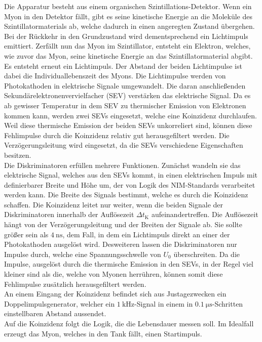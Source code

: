 Die Apparatur besteht aus einem organischen Szintillations-Detektor.
Wenn ein Myon in den Detektor fällt, gibt es seine kinetische Energie an die Moleküle des Szintillatormaterials ab, welche dadurch in einen angeregten Zustand übergehen.
Bei der Rückkehr in den Grundzustand wird dementsprechend ein Lichtimpuls emittiert.
Zerfällt nun das Myon im Szintillator, entsteht ein Elektron, welches, wie zuvor das Myon, seine kinetische Energie an das Szintillatormaterial abgibt.
Es entsteht erneut ein Lichtimpuls.
Der Abstand der beiden Lichtimpulse ist dabei die Individuallebenszeit des Myons.
Die Lichtimpulse werden von Photokathoden in elektrische Signale umgewandelt.
Die daran anschließenden Sekundärelektronenvervielfacher (SEV) verstärken das elektrische Signal.
Da es ab gewisser Temperatur in dem SEV zu thermischer Emission von Elektronen kommen kann, werden zwei SEVs eingesetzt, welche eine Koinzidenz durchlaufen.
Weil diese thermische Emission der beiden SEVs unkorreliert sind, können diese Fehlimpulse durch die Koinzidenz relativ gut herausgefiltert werden.
Die Verzögerungsleitung wird eingesetzt, da die SEVs verschiedene Eigenschaften besitzen.\\
Die Diskriminatoren erfüllen mehrere Funktionen.
Zunächst wandeln sie das elektrische Signal, welches aus den SEVs kommt, in einen elektrischen Impuls mit definierbarer Breite und Höhe um, der von Logik des NIM-Standards verarbeitet werden kann.
Die Breite des Signals bestimmt, welche es durch die Koinzidenz schaffen.
Die Koinzidenz leitet nur weiter, wenn die beiden Signale der Diskriminatoren innerhalb der Auflösezeit $\Delta t_\text{K}$ aufeinandertreffen.
Die Auflösezeit hängt von der Verzögerungsleitung und der Breiten der Signale ab.
Sie sollte größer sein als $\SI{4}{\nano\second}$, dem Fall, in dem ein Lichtimpuls direkt an einer der Photokathoden ausgelöst wird.
Desweiteren lassen die Diskriminatoren nur Impulse durch, welche eine Spannungsschwelle von $U_0$ überschreiten.
Da die Impulse, ausgelöst durch die thermische Emission in den SEVs, in der Regel viel kleiner sind als die, welche von Myonen herrühren, können somit diese Fehlimpulse zusätzlich herausgefiltert werden.\\
An einem Eingang der Koinzidenz befindet sich aus Justagezwecken ein Doppelimpulsgenerator, welcher ein $\SI{1}{\kilo\hertz}$-Signal in einem in $\SI{0,1}{\micro\second}$-Schritten einstellbaren Abstand aussendet.\\
Auf die Koinzidenz folgt die Logik, die die Lebensdauer messen soll.
Im Idealfall erzeugt das Myon, welches in den Tank fällt, einen Startimpuls.
